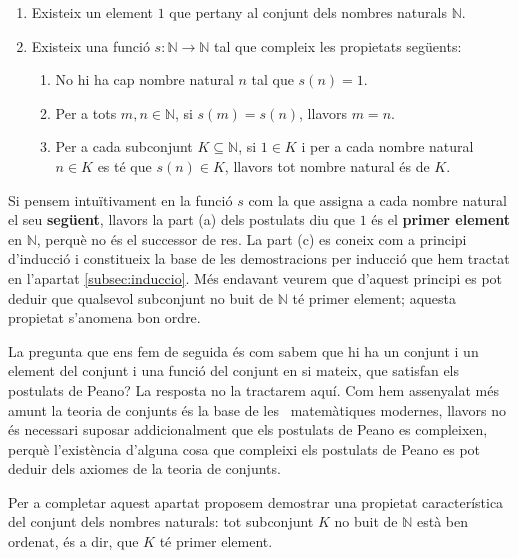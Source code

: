 \begin{enumerate}
\item Existeix un element $1$ que pertany al conjunt dels nombres naturals $\mathbb{N}$.

\item Existeix una funció $s:\mathbb{N}\longrightarrow\mathbb{N}$ tal
que compleix les propietats següents:

\begin{enumerate}
\item No hi ha cap nombre natural $n$ tal que $s(n)=1.$

\item Per a tots $m,n\in\mathbb{N}$, si $s(m)=s(n)$, llavors $m=n$.

\item Per a cada subconjunt $K\subseteq\mathbb{N}$, si $1\in K$ i per a cada
nombre natural $n\in K$ es té que $s(n)\in K$, llavors tot nombre
natural és de $K$.
\end{enumerate}
\end{enumerate}

Si pensem intuïtivament en la funció $s$ com la que assigna a cada
nombre natural el seu \textbf{següent}, llavors la part (a) dels
postulats diu que $1$ és el \textbf{primer element} en $\mathbb{N}$,
perquè no és el successor de res. La part (c) es coneix com a principi
d'inducció i constitueix la base de les demostracions per inducció
que hem tractat en l'apartat \ref{subsec:induccio}. Més endavant veurem que
d'aquest principi es pot deduir que qualsevol subconjunt no buit de
$\mathbb{N}$ té primer element; aquesta propietat s'anomena bon ordre.

\bigskip

La pregunta que ens fem de seguida és com sabem que hi ha un conjunt i
un element del conjunt i una funció del conjunt en si mateix, que
satisfan els postulats de Peano? La resposta no la tractarem aquí. Com
hem assenyalat més amunt la teoria de conjunts és la base de les \
matemàtiques modernes, llavors no és necessari suposar
addicionalment que els postulats de Peano es compleixen, perquè l'existència d'alguna cosa que compleixi els postulats de Peano es pot deduir
dels axiomes de la teoria de conjunts.

\bigskip

Per a completar aquest apartat proposem demostrar una propietat característica del conjunt dels nombres naturals: tot subconjunt $K$ no buit de
$\mathbb{N}$ està ben ordenat, és a dir, que $K$ té primer
element.

